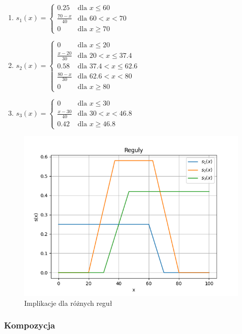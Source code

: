 \documentclass{article}
\begin{document}
\begin{enumerate}[label=Reguła \arabic*:, leftmargin=*]
    \item $s_1(x) = \begin{cases}
        0.25 & \text{dla } x \leq 60 \\
        \frac{70 - x}{40} & \text{dla } 60 < x < 70 \\
        0 & \text{dla } x \geq 70
    \end{cases}$
    \item $s_2(x) = \begin{cases}
        0 & \text{dla } x \leq 20 \\
        \frac{x - 20}{30} & \text{dla } 20 < x \leq 37.4 \\
        0.58 & \text{dla } 37.4 < x \leq 62.6 \\
        \frac{80 - x}{30} & \text{dla } 62.6 < x < 80 \\
        0 & \text{dla } x \geq 80
    \end{cases}$
    \item $s_3(x) = \begin{cases}
        0 & \text{dla } x \leq 30 \\
        \frac{x - 30}{40} & \text{dla } 30 < x < 46.8 \\
        0.42 & \text{dla } x \geq 46.8
    \end{cases}$
\end{enumerate}

\begin{figure}[H]
    \centering
    \includegraphics[width=0.8\linewidth]{Zad1/rules.png}
    \caption{Implikacje dla różnych reguł}
\end{figure}

\subsubsection*{Kompozycja}
\end{document}
